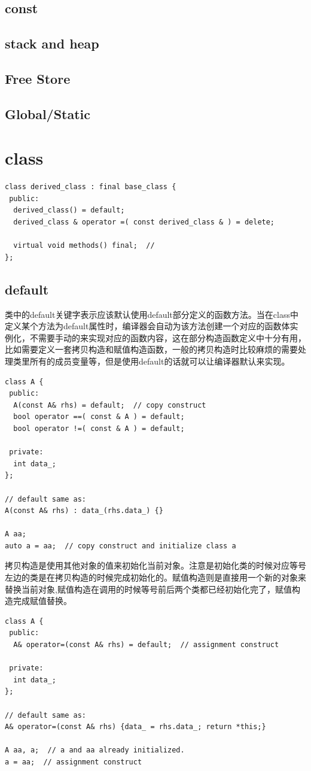 \documentclass[12pt]{book}
\begin{document}
\subsection{const}
\subsection{stack and heap}
\subsection{Free Store}
\subsection{Global/Static}

\section{class}
\begin{lstlisting}
class derived_class : final base_class {
 public:
  derived_class() = default;
  derived_class & operator =( const derived_class & ) = delete;
  
  virtual void methods() final;	 //
};
\end{lstlisting}

\subsection{default}
类中的default关键字表示应该默认使用default部分定义的函数方法。当在class中定义某个方法为default属性时，编译器会自动为该方法创建一个对应的函数体实例化，不需要手动的来实现对应的函数内容，这在部分构造函数定义中十分有用，比如需要定义一套拷贝构造和赋值构造函数，一般的拷贝构造时比较麻烦的需要处理类里所有的成员变量等，但是使用default的话就可以让编译器默认来实现。
\begin{lstlisting}
class A {
 public:
  A(const A& rhs) = default;  // copy construct
  bool operator ==( const & A ) = default;
  bool operator !=( const & A ) = default;
  
 private:
  int data_;
};

// default same as:
A(const A& rhs) : data_(rhs.data_) {}

A aa;
auto a = aa;  // copy construct and initialize class a
\end{lstlisting}
拷贝构造是使用其他对象的值来初始化当前对象。注意是初始化类的时候对应等号左边的类是在拷贝构造的时候完成初始化的。赋值构造则是直接用一个新的对象来替换当前对象,赋值构造在调用的时候等号前后两个类都已经初始化完了，赋值构造完成赋值替换。
\begin{lstlisting}
class A {
 public:
  A& operator=(const A& rhs) = default;  // assignment construct

 private:
  int data_;
};
	
// default same as:
A& operator=(const A& rhs) {data_ = rhs.data_; return *this;}
	
A aa, a;  // a and aa already initialized.
a = aa;  // assignment construct
\end{lstlisting}
\end{document}
